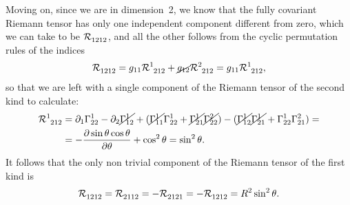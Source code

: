 Moving on, since we are in dimension~2, we know that the fully covariant Riemann
tensor has only one independent component different from zero, which we can take
to be $\riemann{}{1212}$, and all the other follows from the cyclic permutation
rules of the indices
\begin{align*}
  \riemann{}{1212} =
  g_{11} \riemann{1}{212} + \cancel{g_{12}} \riemann{2}{212} = g_{11} \riemann{1}{212},
\end{align*}
so that we are left with a single component of the Riemann tensor of the second kind to
calculate:
\begin{align*}
  \riemann{1}{212} & =
  \derx{1}\christoffel{1}{22} - \derx{2} \cancel{\christoffel{1}{12}} +
  (\cancel{\christoffel{1}{11}}\christoffel{1}{22} +
    \cancel{\christoffel{1}{21}}\cancel{\christoffel{2}{22}}) -
  (\cancel{\christoffel{1}{12}}\cancel{\christoffel{1}{21}} +
    \christoffel{1}{22}\christoffel{2}{21}) =\\
  & = -\pdv{\sin\theta \cos\theta}{\theta} + \cos^2\theta =
  \sin^2 \theta.
\end{align*}
It follows that the only non trivial component of the Riemann tensor of the
first kind is
\begin{align*}
  \riemann{}{1212} = \riemann{}{2112} = - \riemann{}{2121} = -\riemann{}{1212} = R^2\sin^2\theta.
\end{align*}

